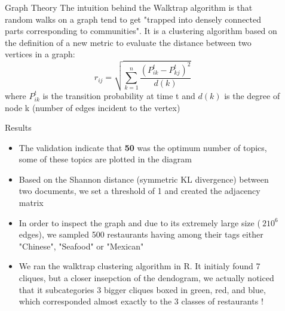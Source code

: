 \documentclass[final]{beamer}
\newlength{\sepwid}
\newlength{\onecolwid}
\newlength{\twocolwid}
\begin{document}
\begin{frame}[t]
\begin{columns}[t]
\begin{column}{\twocolwid}
\end{column} %

\begin{column}{\sepwid}\end{column} %

\begin{column}{\onecolwid}\vspace{-0.6in} %

\begin{block}{Graph Theory}
\small
 The intuition behind the Walktrap algorithm is that random walks on a graph tend to get "trapped into densely connected parts corresponding to communities".\cite{Gr} It is a clustering algorithm based on the definition of a new metric to evaluate the distance between two vertices in a graph:
 $$r_{ij} = \sqrt{\sum\limits_{k=1}^{n}\frac{(P^t_{ik}-P^t_{kj})^2}{d(k)}}$$
 where $P^t_{ik}$ is the transition probability at time t and $d(k)$ is the degree of node k (number of edges incident to the vertex)
\end{block}


\begin{block}{Results}\vspace{-0.2in}
\small
\begin{itemize}
\item The validation indicate that \textbf{50} was the optimum number of topics, some of these topics are plotted in the diagram 
\item Based on the Shannon distance (symmetric KL divergence) between two documents, we set a threshold of 1 and created the adjacency matrix
\item In order to inspect the graph and due to its extremely large size ($\>2 10^{6}$ edges), we sampled 500 restaurants having among their tags either "Chinese", "Seafood" or "Mexican"
\item We ran the walktrap clustering algorithm in R. It initialy found 7 cliques, but a closer insepction of the dendogram, we actually noticed that it subcategories 3 bigger cliques boxed in green, red, and blue, which corresponded almost exactly to the 3 classes of restaurants !
\end{itemize}



\end{block}
\end{column}
\end{columns}
\end{frame}
\end{document}
